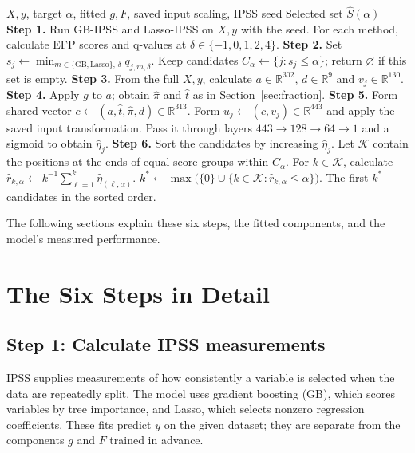 \documentclass[10pt,letterpaper]{article}
\newcommand{\R}{\mathbb{R}}
\begin{document}
\begin{algorithm}[H]
\caption{Apply the model to a new dataset}\label{alg:model}
\small
\begin{algorithmic}[1]
\Require $X,y$, target $\alpha$, fitted $g,F$, saved input scaling, IPSS seed
\Ensure Selected set $\widehat S(\alpha)$
\State \textbf{Step 1.} Run GB-IPSS and Lasso-IPSS on $X,y$ with the seed.
\State For each method, calculate EFP scores and q-values at $\delta\in\{-1,0,1,2,4\}$.
\State \textbf{Step 2.} Set $s_j\gets\min_{m\in\{\mathrm{GB},\mathrm{Lasso}\},\,\delta}q_{j,m,\delta}$.
\State Keep candidates $C_\alpha\gets\{j:s_j\le\alpha\}$; return $\varnothing$ if this set is empty.
\State \textbf{Step 3.} From the full $X,y$, calculate $a\in\R^{302}$, $d\in\R^9$ and $v_j\in\R^{130}$.
\State \textbf{Step 4.} Apply $g$ to $a$; obtain $\widehat\pi$ and $\widehat t$ as in Section~\ref{sec:fraction}.
\State \textbf{Step 5.} Form shared vector $c\gets(a,\widehat t,\widehat\pi,d)\in\R^{313}$.
  \State Form $u_j\gets(c,v_j)\in\R^{443}$ and apply the saved input transformation.
  \State Pass it through layers $443\to128\to64\to1$ and a sigmoid to obtain $\widehat\eta_j$.
\EndFor
\State \textbf{Step 6.} Sort the candidates by increasing $\widehat\eta_j$.
\State Let $\mathcal K$ contain the positions at the ends of equal-score groups within $C_\alpha$.
\State For $k\in\mathcal K$, calculate $\widehat r_{k,\alpha}\gets k^{-1}\sum_{\ell=1}^k\widehat\eta_{(\ell;\alpha)}$.
\State $k^*\gets\max\bigl(\{0\}\cup\{k\in\mathcal K:\widehat r_{k,\alpha}\le\alpha\}\bigr)$.
\State \Return The first $k^*$ candidates in the sorted order.
\end{algorithmic}
\end{algorithm}

The following sections explain these six steps, the fitted components,
and the model's measured performance.

\section{The Six Steps in Detail}
\subsection{Step 1: Calculate IPSS measurements}\label{sec:ipss}
IPSS supplies measurements of how consistently a variable is selected
when the data are repeatedly split. The model uses gradient boosting
(GB), which scores variables by tree importance, and Lasso, which
selects nonzero regression coefficients. These fits predict $y$ on
the given dataset; they are separate from the components $g$ and $F$
trained in advance.
\end{document}
